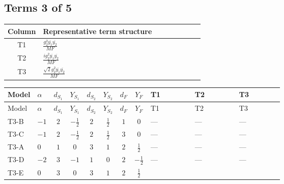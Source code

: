 \documentclass[8pt]{article}
\begin{document}
\begin{landscape}
\subsection*{Terms 3 of 5}
\begin{center}
\begin{tabular}{@{}c >{\raggedright\arraybackslash}p{0.82\linewidth}@{}}
\toprule
Column & Representative term structure \\
\midrule
T1 & \(\displaystyle \frac{g_{2}^{2} \overline{y_{1}} \overline{y_{2}}}{MF}\) \\
\midrule
T2 & \(\displaystyle \frac{i g_{2}^{2} \overline{y_{1}} \overline{y_{2}}}{MF}\) \\
\midrule
T3 & \(\displaystyle \frac{\sqrt{2} g_{2}^{2} \overline{y_{1}} \overline{y_{2}}}{MF}\) \\
\midrule
\bottomrule
\end{tabular}
\end{center}
\smallskip
\tiny
\begin{longtable}{@{}llcccccc >{\raggedright\arraybackslash}p{0.21\linewidth} >{\raggedright\arraybackslash}p{0.21\linewidth} >{\raggedright\arraybackslash}p{0.21\linewidth}@{}}
\toprule
Model & $\alpha$ & $d_{S_1}$ & $Y_{S_1}$ & $d_{S_2}$ & $Y_{S_2}$ & $d_F$ & $Y_F$ & T1 & T2 & T3 \\
\midrule
\endfirsthead
\toprule
Model & $\alpha$ & $d_{S_1}$ & $Y_{S_1}$ & $d_{S_2}$ & $Y_{S_2}$ & $d_F$ & $Y_F$ & T1 & T2 & T3 \\
\midrule
\endhead
T3-B & $-1$ & $2$ & $-\frac{1}{2}$ & $2$ & $\frac{1}{2}$ & $1$ & $0$ & --- & --- & --- \\
\midrule
T3-C & $-1$ & $2$ & $-\frac{1}{2}$ & $2$ & $\frac{1}{2}$ & $3$ & $0$ & --- & --- & --- \\
\midrule
T3-A & $0$ & $1$ & $0$ & $3$ & $1$ & $2$ & $\frac{1}{2}$ & --- & --- & --- \\
\midrule
T3-D & $-2$ & $3$ & $-1$ & $1$ & $0$ & $2$ & $-\frac{1}{2}$ & --- & --- & --- \\
\midrule
T3-E & $0$ & $3$ & $0$ & $3$ & $1$ & $2$ & $\frac{1}{2}$ & \scriptsize\adjustbox{max width=\linewidth}{$\begin{gathered} - \frac{g_{2}^{2} \overline{y_{1}} \overline{y_{2}}}{2 MF}\end{gathered}$} & \scriptsize\adjustbox{max width=\linewidth}{$\begin{gathered} \frac{i g_{2}^{2} \overline{y_{1}} \overline{y_{2}}}{2 MF}\end{gathered}$} & \scriptsize\adjustbox{max width=\linewidth}{$\begin{gathered} - \frac{45 \sqrt{2} g_{2}^{2} \overline{y_{1}} \overline{y_{2}}}{16 MF}\end{gathered}$} \\
\midrule
\bottomrule
\end{longtable}
\clearpage

\end{landscape}
\end{document}
